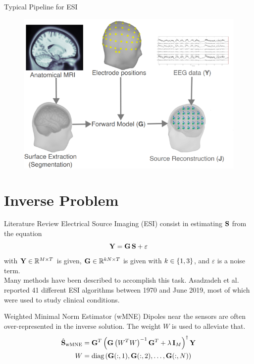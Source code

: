 \documentclass[progressbar=head]{beamer}
\begin{document}
\begin{frame}{Typical Pipeline for ESI}
\begin{figure}
\centering
\includegraphics[width=0.7\linewidth]{./img_dev/pipeline}
\end{figure}
\end{frame}


{
\section{Inverse Problem}
}

\begin{frame}{Literature Review}
Electrical Source Imaging (ESI) consist in estimating $\mathbf{S}$ from the equation
\begin{equation}
\mathbf{Y} = \mathbf{G}\, \mathbf{S} + \varepsilon
\end{equation}
with $\mathbf{Y}\in \mathbb{R}^{M\times T}$ is given, $\mathbf{G}\in \mathbb{R}^{kN\times T}$ is given with $k\in \left\{ 1,3 \right\}$, and $\varepsilon$ is a noise term.\\

Many methods have been described to accomplish this task.
%
Asadzadeh et al. reported 41 different ESI algorithms between 1970 and June 2019, most of which were used to study clinical conditions.
\end{frame}

\begin{frame}{Weighted Minimal Norm Estimator (wMNE)}
Dipoles near the sensors are often over-represented in the inverse solution. The weight $W$ is used to alleviate that.
\begin{align}
\hat{\mathbf{S}}_\text{wMNE} 
&=
\mathbf{G}^T
\left( \mathbf{G} \left( W^T W \right)^{-1} \mathbf{G}^T + \lambda\, \mathbf{I}_M \right)^\dagger \mathbf{Y}
\\
W &=
\text{diag}\left(   \mathbf{G}(:,1), \mathbf{G}(:,2), \dots, \mathbf{G}(:,N)   \right)
\end{align}
\end{frame}
\end{document}
